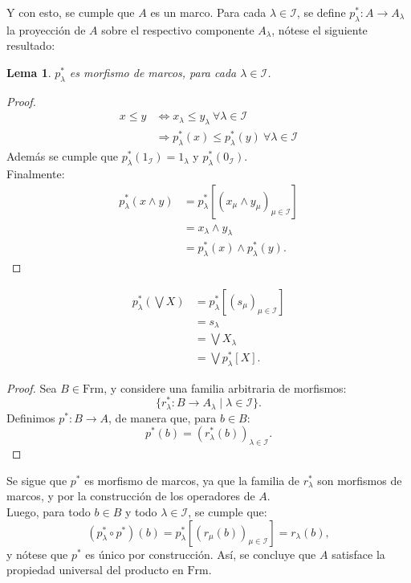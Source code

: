 \documentclass[12pt,letterpaper,titlepage]{article}
\newtheorem{lemma}{Lema}
\theoremstyle{definition}
\newcommand\<{\langle}
\renewcommand\>{\rangle}
\newcommand{\Frm}{\mathrm{Frm}}
\begin{document}
Y con esto, se cumple que $A$ es un marco.
    Para cada $\lambda\in\mathscr{I}$, se define $p^*_\lambda:A\to A_\lambda$ la proyección de $A$ sobre el respectivo componente $A_\lambda$, nótese el siguiente resultado:
    \begin{lemma}
        $p^*_\lambda$ es morfismo de marcos, para cada $\lambda\in\mathscr{I}$.
    \end{lemma}
        \begin{proof}
            \begin{align*}
                x\leq y & \Longleftrightarrow x_\lambda\leq y_\lambda \ \forall\lambda\in\mathscr{I}\\
                & \Rightarrow p^*_\lambda(x)\leq p^*_\lambda(y)\ \forall\lambda\in\mathscr{I} 
            \end{align*}
            Además se cumple que $p^*_\lambda(1_\mathscr{I})=1_\lambda$ y $p^*_\lambda(0_\mathscr{I})$.\\
            Finalmente:
            \begin{align*}
                p^*_\lambda(x\wedge y) & = p^*_\lambda[(x_\mu\wedge y_\mu)_{\mu\in\mathscr{I}}]\\
                & = x_\lambda\wedge y_\lambda\\
                & = p^*_\lambda(x)\wedge p^*_\lambda(y).
            \end{align*}
        \end{proof}
\begin{align*}
    p^*_\lambda(\bigvee X) & = p^*_\lambda[(s_\mu)_{\mu\in\mathscr{I}}] \\
                           & = s_\lambda \\
                           & = \bigvee X_\lambda \\
                           & = \bigvee p^*_\lambda[X].
\end{align*}
\begin{proof}
    Sea $B\in\Frm$, y considere una familia arbitraria de morfismos:
    \begin{equation*}
        \{r^*_\lambda:B\to A_\lambda\mid\lambda\in\mathscr{I}\}.
    \end{equation*}
    Definimos $p^*:B\to A$, de manera que, para $b\in B$:
    \begin{equation*}
        p^*(b) = (r^*_\lambda(b))_{\lambda\in\mathscr{I}}.
    \end{equation*}
\end{proof}
Se sigue que $p^*$ es morfismo de marcos, ya que la familia de $r^*_\lambda$ son morfismos de marcos, y por la construcción de los operadores de $A$.\\
Luego, para todo $b\in B$ y todo $\lambda\in\mathscr{I}$, se cumple que:
\begin{equation*}
    (p^*_\lambda\circ p^*)(b) = p^*_\lambda[(r_\mu(b))_{\mu\in\mathscr{I}}] = r_\lambda(b),
\end{equation*}
y nótese que $p^*$ es único por construcción. Así, se concluye que $A$ satisface la propiedad universal del producto en $\Frm$.
\end{document}

